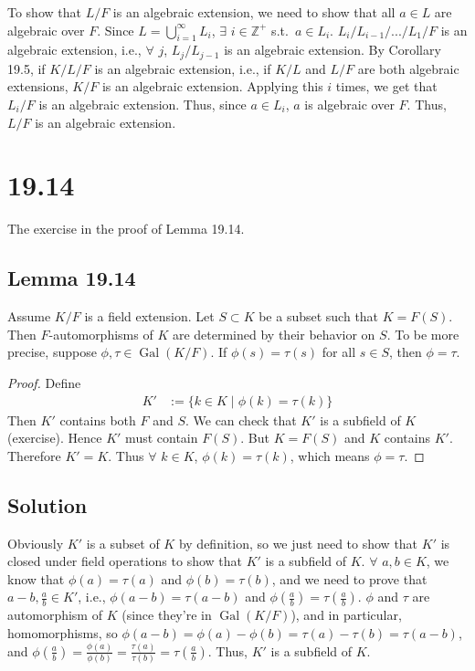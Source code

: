 \documentclass[fleqn]{article}
\DeclareMathOperator{\Gal}{Gal}
\begin{document}
        To show that $L/F$ is an algebraic extension, we need to show that all $a \in L$ are algebraic over $F$.  Since $L = \bigcup\limits_{i = 1}^{\infty} L_i$, $\exists$ $i \in \mathbb{Z}^+$ s.t.\ $a \in L_i$. 
        $L_i/L_{i - 1}/.../L_1/F$ is an algebraic extension, i.e., $\forall$ $j$, $L_j/L_{j - 1}$ is an algebraic extension.  By Corollary 19.5, if $K/L/F$ is an algebraic extension, i.e., if $K/L$ and $L/F$ are both algebraic extensions, $K/F$ is an algebraic extension.  Applying this $i$ times, we get that $L_i/F$ is an algebraic extension.  Thus, since $a \in L_i$, $a$ is algebraic over $F$.  Thus, $L/F$ is an algebraic extension.
    
    \section{19.14}
    The exercise in the proof of Lemma 19.14.
        
        \subsection{Lemma 19.14}
        Assume $K/F$ is a field extension.  Let $S \subset K$ be a subset such that $K = F(S)$.  Then $F$-automorphisms of $K$ are determined by their behavior on $S$.  To be more precise, suppose $\phi, \tau \in \Gal(K/F)$.  If $\phi(s) = \tau(s)$ for all $s \in S$, then $\phi = \tau$.
        
        \begin{proof}
            Define
            \begin{align}
                K' &:= \{k \in K \mid \phi(k) = \tau(k)\}
            \end{align}
            Then $K'$ contains both $F$ and $S$.  We can check that $K'$ is a subfield of $K$ (exercise).  Hence $K'$ must contain $F(S)$.  But $K = F(S)$ and $K$ contains $K'$.  Therefore $K' = K$.  Thus $\forall$ $k \in K$, $\phi(k) = \tau(k)$, which means $\phi = \tau$.
        \end{proof}
        
        \subsection{Solution}
        Obviously $K'$ is a subset of $K$ by definition, so we just need to show that $K'$ is closed under field operations to show that $K'$ is a subfield of $K$.  $\forall$ $a, b \in K$, we know that $\phi(a) = \tau(a)$ and $\phi(b) = \tau(b)$, and we need to prove that $a - b, \frac{a}{b} \in K'$, i.e., $\phi(a - b) = \tau(a - b)$ and $\phi\left(\frac{a}{b}\right) = \tau\left(\frac{a}{b}\right)$.  $\phi$ and $\tau$ are automorphism of $K$ (since they're in $\Gal(K/F)$), and in particular, homomorphisms, so $\phi(a - b) = \phi(a) - \phi(b) = \tau(a) - \tau(b) = \tau(a - b)$, and $\phi\left(\frac{a}{b}\right) = \frac{\phi(a)}{\phi(b)} = \frac{\tau(a)}{\tau(b)} = \tau\left(\frac{a}{b}\right)$.  Thus, $K'$ is a subfield of $K$.
    
\end{document}
